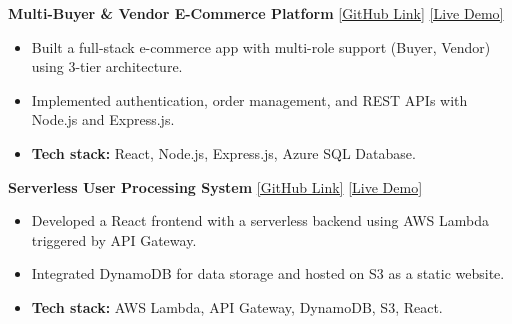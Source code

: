 \documentclass[a4paper,10.5pt]{article}
\begin{document}
\vspace{0.2cm}


\textbf{Multi-Buyer \& Vendor E-Commerce Platform} \hfill
{\small \href{https://github.com/Muhammad-Ahmad17/E_Commerce}{[GitHub Link]} \enspace \href{https://e-commerce1-muhammad-ahmads-projects-1458b467.vercel.app/}{[Live Demo]}}
\begin{itemize}[nosep, leftmargin=1.5em, topsep=2pt]
  \item Built a full-stack e-commerce app with multi-role support (Buyer, Vendor) using 3-tier architecture.
  \item Implemented authentication, order management, and REST APIs with Node.js and Express.js.
  \item \textbf{Tech stack:} React, Node.js, Express.js, Azure SQL Database.
\end{itemize}
\vspace{0.2cm}

\textbf{Serverless User Processing System} \hfill
{\small \href{https://github.com/Muhammad-Ahmad17/getApiForUserData}{[GitHub Link]} \enspace \href{http://user-processing-system-ahmad.s3-website-us-east-1.amazonaws.com/}{[Live Demo]}}
\begin{itemize}[nosep, leftmargin=1.5em, topsep=2pt]
  \item Developed a React frontend with a serverless backend using AWS Lambda triggered by API Gateway.
  \item Integrated DynamoDB for data storage and hosted on S3 as a static website.
  \item \textbf{Tech stack:} AWS Lambda, API Gateway, DynamoDB, S3, React.
\end{itemize}


\end{document}
